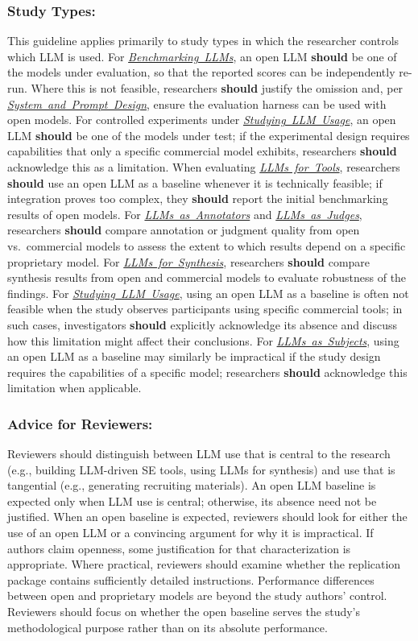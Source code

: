 \documentclass[smallextended]{svjour3}
\newcommand{\should}{\textbf{should}\xspace}
\newcommand{\annotators}{\hyperref[sec:llms-as-annotators]{\mbox{\emph{LLMs as Annotators}}}\xspace}
\newcommand{\judges}{\hyperref[sec:llms-as-judges]{\mbox{\emph{LLMs as Judges}}}\xspace}
\newcommand{\synthesis}{\hyperref[sec:llms-for-synthesis]{\mbox{\emph{LLMs for Synthesis}}}\xspace}
\newcommand{\subjects}{\hyperref[sec:llms-as-subjects]{\mbox{\emph{LLMs as Subjects}}}\xspace}
\newcommand{\llmusage}{\hyperref[sec:studying-llm-usage-in-software-engineering]{\mbox{\emph{Studying LLM Usage}}}\xspace}
\newcommand{\newtools}{\hyperref[sec:llms-for-new-software-engineering-tools]{\mbox{\emph{LLMs for Tools}}}\xspace}
\newcommand{\benchmarkingtasks}{\hyperref[sec:benchmarking-llms-for-software-engineering-tasks]{\mbox{\emph{Benchmarking LLMs}}}\xspace}
\newcommand{\annotators}{\href{/study-types/annotators/}{\emph{LLMs as Annotators}}\xspace}
\newcommand{\judges}{\href{/study-types/judges/}{\emph{LLMs as Judges}}\xspace}
\newcommand{\synthesis}{\href{/study-types/synthesis/}{\emph{LLMs for Synthesis}}\xspace}
\newcommand{\subjects}{\href{/study-types/subjects/}{\emph{LLMs as Subjects}}\xspace}
\newcommand{\llmusage}{\href{/study-types/usage/}{\emph{Studying LLM Usage}}\xspace}
\newcommand{\newtools}{\href{/study-types/tools/}{\emph{LLMs for Tools}}\xspace}
\newcommand{\benchmarkingtasks}{\href{/study-types/benchmarking/}{\emph{Benchmarking LLMs}}\xspace}
\newcommand{\design}{\hyperref[sec:report-system-and-prompt-design]{\mbox{\emph{System and Prompt Design}}}\xspace}
\newcommand{\design}{\href{/guidelines/design/}{\emph{System and Prompt Design}}\xspace}
\newcommand{\guidelinesubsubsection}[1]{\subsubsection{\bfseries #1:}}
\newcommand{\guidelinesubsubsection}[1]{\subsubsection{#1}}
\begin{document}
\guidelinesubsubsection{Study Types}

This guideline applies primarily to study types in which the researcher controls which LLM is used.
For \benchmarkingtasks, an open LLM \should be one of the models under evaluation, so that the reported scores can be independently re-run. Where this is not feasible, researchers \should justify the omission and, per \design, ensure the evaluation harness can be used with open models.
For controlled experiments under \llmusage, an open LLM \should be one of the models under test; if the experimental design requires capabilities that only a specific commercial model exhibits, researchers \should acknowledge this as a limitation.
When evaluating \newtools, researchers \should use an open LLM as a baseline whenever it is technically feasible; if integration proves too complex, they \should report the initial benchmarking results of open models.
For \annotators and \judges, researchers \should compare annotation or judgment quality from open vs.\ commercial models to assess the extent to which results depend on a specific proprietary model.
For \synthesis, researchers \should compare synthesis results from open and commercial models to evaluate robustness of the findings.
For \llmusage, using an open LLM as a baseline is often not feasible when the study observes participants using specific commercial tools; in such cases, investigators \should explicitly acknowledge its absence and discuss how this limitation might affect their conclusions.
For \subjects, using an open LLM as a baseline may similarly be impractical if the study design requires the capabilities of a specific model; researchers \should acknowledge this limitation when applicable.

\guidelinesubsubsection{Advice for Reviewers}

Reviewers should distinguish between LLM use that is central to the research (e.g., building LLM-driven SE tools, using LLMs for synthesis) and use that is tangential (e.g., generating recruiting materials). An open LLM baseline is expected only when LLM use is central; otherwise, its absence need not be justified.
When an open baseline is expected, reviewers should look for either the use of an open LLM or a convincing argument for why it is impractical. If authors claim openness, some justification for that characterization is appropriate. Where practical, reviewers should examine whether the replication package contains sufficiently detailed instructions.
Performance differences between open and proprietary models are beyond the study authors' control. Reviewers should focus on whether the open baseline serves the study's methodological purpose rather than on its absolute performance.
\end{document}
